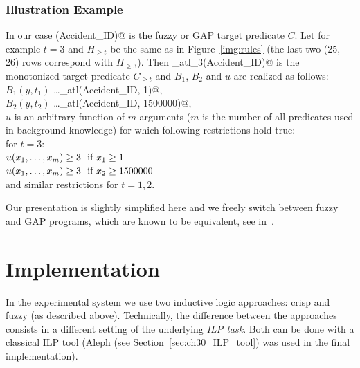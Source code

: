 \subsubsection{Illustration Example}

In our case \verb@serious(Accident_ID)@ is the fuzzy or GAP target predicate $C$. Let for example $t=3$ and $H_{\ge t}$ be the same as in Figure~\ref{img:rules} (the last two (25, 26) rows correspond with $H_{\ge 3}$). Then \verb@serious_atl_3(Accident_ID)@ is the monotonized target predicate $C_{\ge t}$ and $B_1$, $B_2$ and $u$ are realized as follows:\\
\hspace*{1cm}$B_1(y,t_1)$ \dots \verb@fatalities_atl(Accident_ID, 1)@,\\
\hspace*{1cm}$B_2(y,t_2)$ \dots \verb@damage_atl(Accident_ID, 1500000)@,\\
$u$ is an arbitrary function of $m$ arguments ($m$ is the number of all predicates used in background knowledge) for which following restrictions hold true:\\
for $t=3$:\\
\hspace*{1cm}$u(x_1,\dots,x_m) \ge 3 \ \hbox{ if }x_1\ge 1$\\
\hspace*{1cm}$u(x_1,\dots,x_m) \ge 3 \ \hbox{ if }x_2\ge 1500000$\\
and similar restrictions for $t=1,2$.


\bigskip
Our presentation is slightly simplified here and we freely switch between fuzzy and GAP programs, which are known to be equivalent, see in~\citep{biblio:KLV}.


\section{Implementation} \label{sec:implementation}

In the experimental system we use two inductive logic approaches: crisp and fuzzy (as described above). Technically, the difference between the approaches consists in a different setting of the underlying \emph{ILP task}. Both can be done with a classical ILP tool (Aleph (see Section~\ref{sec:ch30_ILP_tool}) was used in the final implementation).

